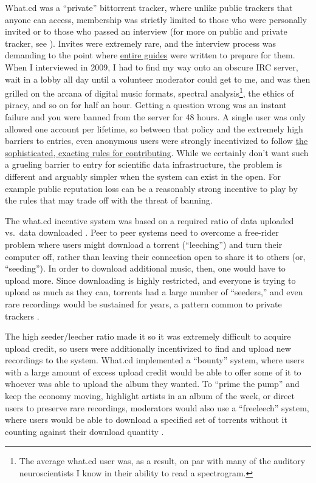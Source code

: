 \documentclass[10pt]{article}
\begin{document}
\begin{multicols}{2}
What.cd was a ``private'' bittorrent tracker, where unlike public
trackers that anyone can access, membership was strictly limited to
those who were personally invited or to those who passed an interview
(for more on public and private tracker, see \cite{meulpolderPublicPrivateBitTorrent} ). Invites were extremely rare,
and the interview process was demanding to the point where
\href{https://opentrackers.org/whatinterviewprep.com/index.html}{entire
guides} were written to prepare for them. When I interviewed in 2009, I
had to find my way onto an obscure IRC server, wait in a lobby all day
until a volunteer moderator could get to me, and was then grilled on the
arcana of digital music formats, spectral analysis\footnote{The average
  what.cd user was, as a result, on par with many of the auditory
  neuroscientists I know in their ability to read a spectrogram.}, the
ethics of piracy, and so on for half an hour. Getting a question wrong
was an instant failure and you were banned from the server for 48 hours.
A single user was only allowed one account per lifetime, so between that
policy and the extremely high barriers to entries, even anonymous users
were strongly incentivized to follow
\href{https://opentrackers.org/whatinterviewprep.com/prepare-for-the-interview/what-cd-rules/index.html}{the
sophisticated, exacting rules for contributing}. While we certainly
don't want such a grueling barrier to entry for scientific data
infrastructure, the problem is different and arguably simpler when the
system can exist in the open. For example public reputation loss can be
a reasonably strong incentive to play by the rules that may trade off
with the threat of banning.

The what.cd incentive system was based on a required ratio of data
uploaded vs.~data downloaded \cite{jiaHowSurviveThrive2013} .
Peer to peer systems need to overcome a free-rider problem where users
might download a torrent (``leeching'') and turn their computer off,
rather than leaving their connection open to share it to others (or,
``seeding''). In order to download additional music, then, one would
have to upload more. Since downloading is highly restricted, and
everyone is trying to upload as much as they can, torrents had a large
number of ``seeders,'' and even rare recordings would be sustained for
years, a pattern common to private trackers \cite{liuUnderstandingImprovingRatio2010} .

The high seeder/leecher ratio made it so it was extremely difficult to
acquire upload credit, so users were additionally incentivized to find
and upload new recordings to the system. What.cd implemented a
``bounty'' system, where users with a large amount of excess upload
credit would be able to offer some of it to whoever was able to upload
the album they wanted. To ``prime the pump'' and keep the economy
moving, highlight artists in an album of the week, or direct users to
preserve rare recordings, moderators would also use a ``freeleech''
system, where users would be able to download a specified set of
torrents without it counting against their download quantity \cite{kashEconomicsBitTorrentCommunities2012, chenImprovingSustainabilityPrivate2011a} .


\end{multicols}
\end{document}
